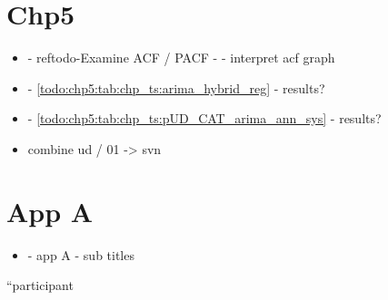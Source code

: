 \section{Chp5}
\begin{itemize}
\item - ref{todo-Examine ACF / PACF} - - interpret acf graph
\item - \ref{todo:chp5:tab:chp_ts:arima_hybrid_reg} - results?
\item - \ref{todo:chp5:tab:chp_ts:pUD_CAT_arima_ann_sys} - results?
\item combine ud / 01 -> svn
\end{itemize}

\section{App A}
\begin{itemize}
\item - app A - sub titles
\end{itemize}


\textquotedblleft participant
